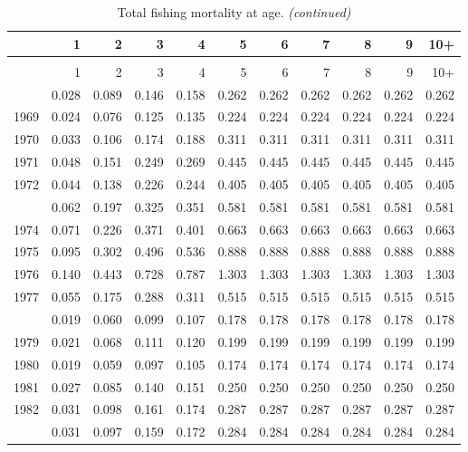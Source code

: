\documentclass[
]{article}
\begin{document}
\begin{longtable}[t]{lrrrrrrrrrr}
\caption{\label{tab:FAA-tot-table}Total fishing mortality at age.}\\
\toprule
  & 1 & 2 & 3 & 4 & 5 & 6 & 7 & 8 & 9 & 10+\\
\midrule
\endfirsthead
\caption[]{Total fishing mortality at age. \textit{(continued)}}\\
\toprule
  & 1 & 2 & 3 & 4 & 5 & 6 & 7 & 8 & 9 & 10+\\
\midrule
\endhead

\endfoot
\bottomrule
\endlastfoot
1968 & 0.028 & 0.089 & 0.146 & 0.158 & 0.262 & 0.262 & 0.262 & 0.262 & 0.262 & 0.262\\
1969 & 0.024 & 0.076 & 0.125 & 0.135 & 0.224 & 0.224 & 0.224 & 0.224 & 0.224 & 0.224\\
1970 & 0.033 & 0.106 & 0.174 & 0.188 & 0.311 & 0.311 & 0.311 & 0.311 & 0.311 & 0.311\\
1971 & 0.048 & 0.151 & 0.249 & 0.269 & 0.445 & 0.445 & 0.445 & 0.445 & 0.445 & 0.445\\
1972 & 0.044 & 0.138 & 0.226 & 0.244 & 0.405 & 0.405 & 0.405 & 0.405 & 0.405 & 0.405\\
\addlinespace
1973 & 0.062 & 0.197 & 0.325 & 0.351 & 0.581 & 0.581 & 0.581 & 0.581 & 0.581 & 0.581\\
1974 & 0.071 & 0.226 & 0.371 & 0.401 & 0.663 & 0.663 & 0.663 & 0.663 & 0.663 & 0.663\\
1975 & 0.095 & 0.302 & 0.496 & 0.536 & 0.888 & 0.888 & 0.888 & 0.888 & 0.888 & 0.888\\
1976 & 0.140 & 0.443 & 0.728 & 0.787 & 1.303 & 1.303 & 1.303 & 1.303 & 1.303 & 1.303\\
1977 & 0.055 & 0.175 & 0.288 & 0.311 & 0.515 & 0.515 & 0.515 & 0.515 & 0.515 & 0.515\\
\addlinespace
1978 & 0.019 & 0.060 & 0.099 & 0.107 & 0.178 & 0.178 & 0.178 & 0.178 & 0.178 & 0.178\\
1979 & 0.021 & 0.068 & 0.111 & 0.120 & 0.199 & 0.199 & 0.199 & 0.199 & 0.199 & 0.199\\
1980 & 0.019 & 0.059 & 0.097 & 0.105 & 0.174 & 0.174 & 0.174 & 0.174 & 0.174 & 0.174\\
1981 & 0.027 & 0.085 & 0.140 & 0.151 & 0.250 & 0.250 & 0.250 & 0.250 & 0.250 & 0.250\\
1982 & 0.031 & 0.098 & 0.161 & 0.174 & 0.287 & 0.287 & 0.287 & 0.287 & 0.287 & 0.287\\
\addlinespace
1983 & 0.031 & 0.097 & 0.159 & 0.172 & 0.284 & 0.284 & 0.284 & 0.284 & 0.284 & 0.284\\

\end{longtable}
\end{document}
